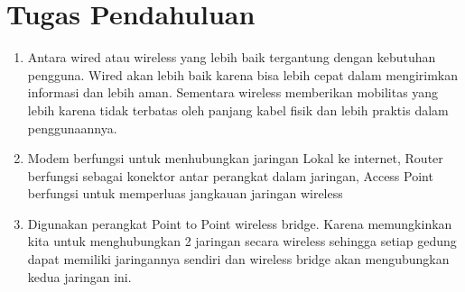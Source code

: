 \section{Tugas Pendahuluan}
\begin{enumerate}
	\item Antara wired atau wireless yang lebih baik tergantung dengan kebutuhan pengguna. Wired akan lebih baik karena bisa lebih cepat dalam mengirimkan informasi dan lebih aman. Sementara wireless memberikan mobilitas yang lebih karena tidak terbatas oleh panjang kabel fisik dan lebih praktis dalam penggunaannya.
	\item Modem berfungsi untuk menhubungkan jaringan Lokal ke internet, Router berfungsi sebagai konektor antar perangkat dalam jaringan, Access Point berfungsi untuk memperluas jangkauan jaringan wireless
	\item Digunakan perangkat Point to Point wireless bridge. Karena memungkinkan kita untuk menghubungkan 2 jaringan secara wireless sehingga setiap gedung dapat memiliki jaringannya sendiri dan wireless bridge akan mengubungkan kedua jaringan ini.
\end{enumerate}